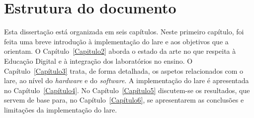 \section{Estrutura do documento}
Esta dissertação está organizada em seis capítulos. Neste primeiro capítulo, foi feita uma breve introdução à implementação do \acrshort{lare} e aos objetivos que a orientam. O Capítulo~\ref{Capitulo2} aborda o estado da arte no que respeita à Educação Digital e à integração dos laboratórios no ensino. O Capítulo~\ref{Capítulo3} trata, de forma detalhada, os aspetos relacionados com o \acrshort{lare}, ao nível do \textit{hardware} e do \textit{software}. A implementação do \acrshort{lare} é apresentada no Capítulo~\ref{Capítulo4}. No Capítulo~\ref{Capítulo5} discutem-se os resultados, que servem de base para, no Capítulo~\ref{Capítulo6}, se apresentarem as conclusões e limitações da implementação do \acrshort{lare}.


